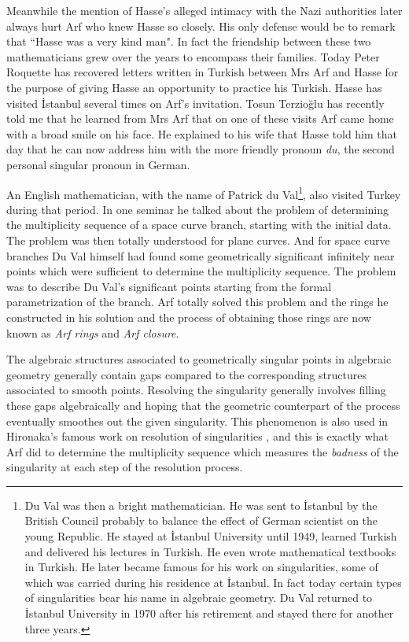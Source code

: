 \documentclass[12pt]{amsart}
\begin{document}
Meanwhile the mention of Hasse's alleged intimacy with the Nazi authorities later always hurt Arf who knew Hasse so closely. His only defense would be to remark that ``Hasse was a very kind man". In fact the friendship between these two mathematicians grew over the years to encompass their families. Today Peter Roquette has recovered letters written in Turkish between Mrs Arf and Hasse  for the purpose of giving Hasse an opportunity to practice his Turkish. Hasse has visited {\.I}stanbul several times on Arf's invitation. Tosun Terzio\u{g}lu has recently told me that he learned from Mrs Arf that on one of these visits Arf came home with a broad smile on his face. He explained to his wife that Hasse told him that day  that he can now address him with the more friendly pronoun \emph{du}, the second personal singular pronoun in German.

An English mathematician, with the name of Patrick du Val\footnote{Du Val was then a bright mathematician. He was sent to {\.I}stanbul by the British Council probably to balance the effect of German scientist on the young Republic. He stayed at {\.I}stanbul University until 1949, learned Turkish and delivered his lectures in Turkish. He even wrote  mathematical textbooks in Turkish. He later became famous for his work on singularities, some of which was carried during his residence at {\.I}stanbul. In fact today certain types of singularities bear his name in algebraic geometry. Du Val returned to {\.I}stanbul University in 1970 after his retirement and stayed there for another three years.}, also visited Turkey during that period. In one seminar he talked about the problem of determining the multiplicity sequence of a space curve branch, starting with the initial data. The problem was then totally understood for plane curves. And for space curve branches Du Val himself had found some geometrically significant infinitely near points which were sufficient to determine the multiplicity sequence. The problem was  to describe Du Val's significant points starting from the formal parametrization of the branch.  Arf totally solved this problem and the rings he constructed in his solution and the process of obtaining those rings are now known as \emph{Arf rings} and \emph{Arf closure}.

The algebraic structures associated to geometrically singular points in algebraic geometry generally contain gaps compared to the corresponding structures associated to smooth points. Resolving the singularity generally involves filling these gaps algebraically and hoping that the geometric counterpart of the process eventually smoothes out the given singularity. This phenomenon is also used in Hironaka's famous work on resolution of singularities \cite{hironaka}, and this is exactly what Arf did to determine the multiplicity sequence which measures the \emph{badness} of the singularity at each step of the resolution process.
\end{document}
